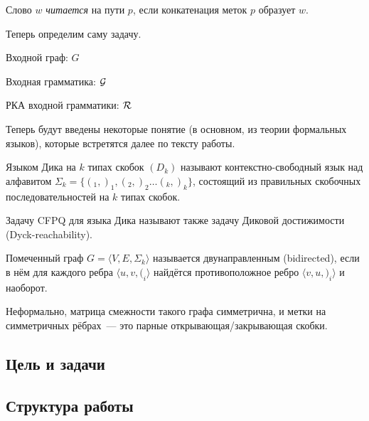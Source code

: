 \begin{definition}
Слово $w$ \textit{читается} на пути $p$, если конкатенация меток $p$ образует $w$. 
\end{definition}

Теперь определим саму задачу.

\begin{definition}
    Входной граф: $G$

    Входная грамматика: $\mathcal{G}$

    РКА входной грамматики: $\mathcal{R}$


\end{definition}

Теперь будут введены некоторые понятие (в основном, из теории формальных языков), которые встретятся далее по тексту работы.

\begin{definition}
    Языком Дика на $k$ типах скобок $(D_k)$ называют контекстно-свободный язык над алфавитом $\Sigma_k = \{ (_1, )_1, (_2, )_2 \dots (_k, )_k \}$, состоящий из правильных скобочных последовательностей на $k$ типах скобок.

    Задачу CFPQ для языка Дика называют также задачу Диковой достижимости (Dyck-reachability).
\end{definition}

\begin{definition}
    Помеченный граф $G = \langle V, E, \Sigma_k \rangle$ называется двунаправленным (bidirected), если в нём для каждого ребра $\langle u, v, (_i \rangle$ найдётся противоположное ребро $\langle v, u, )_i \rangle$ и наоборот.

    Неформально, матрица смежности такого графа симметрична, и метки на симметричных рёбрах~--- это парные открывающая/закрывающая скобки.
\end{definition}

\begin{definition}

\end{definition}

\subsection*{Цель и задачи}



\subsection*{Структура работы}